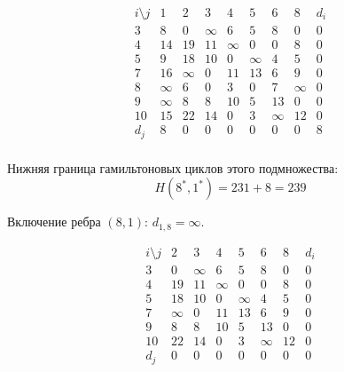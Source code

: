 \documentclass{article}
\begin{document}
\[
    \begin{array}{c|ccccccc|c}
        i \setminus j & 1      & 2      & 3      & 4      & 5      & 6      & 8      & d_i \\
        \hline
        3             & 8      & 0      & \infty & 6      & 5      & 8      & 0      & 0   \\
        4             & 14     & 19     & 11     & \infty & 0      & 0      & 8      & 0   \\
        5             & 9      & 18     & 10     & 0      & \infty & 4      & 5      & 0   \\
        7             & 16     & \infty & 0      & 11     & 13     & 6      & 9      & 0   \\
        8             & \infty & 6      & 0      & 3      & 0      & 7      & \infty & 0   \\
        9             & \infty & 8      & 8      & 10     & 5      & 13     & 0      & 0   \\
        10            & 15     & 22     & 14     & 0      & 3      & \infty & 12     & 0   \\
        \hline
        d_j           & 8      & 0      & 0      & 0      & 0      & 0      & 0      & 8   \\
    \end{array}
\]

Нижняя граница гамильтоновых циклов этого подмножества:
\[
    H(8^*,1^*) = 231 + 8 = 239
\]

Включение ребра $(8,1)$: $d_{1,8}=\infty$.

\[
    \begin{array}{c|cccccc|c}
        i \setminus j & 2      & 3      & 4      & 5      & 6      & 8  & d_i \\
        \hline
        3             & 0      & \infty & 6      & 5      & 8      & 0  & 0   \\
        4             & 19     & 11     & \infty & 0      & 0      & 8  & 0   \\
        5             & 18     & 10     & 0      & \infty & 4      & 5  & 0   \\
        7             & \infty & 0      & 11     & 13     & 6      & 9  & 0   \\
        9             & 8      & 8      & 10     & 5      & 13     & 0  & 0   \\
        10            & 22     & 14     & 0      & 3      & \infty & 12 & 0   \\
        \hline
        d_j           & 0      & 0      & 0      & 0      & 0      & 0  & 0   \\
    \end{array}
\]
\end{document}
